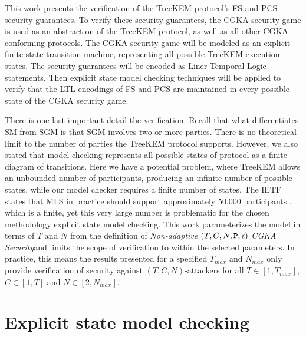 This work presents the verification of the TreeKEM protocol's FS and PCS security guarantees.
To verify these security guarantees, the CGKA security game is used as an abstraction of the TreeKEM protocol, as well as all other CGKA-conforming protocols.
The CGKA security game will be modeled as an explicit finite state transition machine, representing all possible TreeKEM execution states.
The security guarantees will be encoded as Liner Temporal Logic statements.
Then explicit state model checking techniques will be applied to verify that the LTL encodings of FS and PCS are maintained in every possible state of the CGKA security game.

There is one last important detail the verification.
Recall that what differentiates SM from SGM is that SGM involves two or more parties.
There is no theoretical limit to the number of parties the TreeKEM protocol supports.
However, we also stated that model checking represents all possible states of protocol as a finite diagram of transitions.
Here we have a potential problem, where TreeKEM allows an unbounded number of participants, producing an infinite number of possible states, while our model checker requires a finite number of states.
The IETF states that MLS in practice should support approximately 50,000 participants \autocite{Omara2020}, which is a finite, yet this very large number is problematic for the chosen methodology explicit state model checking.
This work parameterizes the model in terms of \(T\) and \(N\) from the definition of \emph{Non-adaptive} \((T, C, N, \textbf{\texttt{P}}, \epsilon)\) \emph{CGKA Security}and limits the scope of verification to within the selected parameters.
In practice, this means the results presented for a specified \(T_{max}\) and \(N_{max}\) only provide verification of security against \((T, C, N)\)-attackers for all \(T \in [1, T_{max}]\), \(C \in [1, T]\) and \(N \in [2, N_{max}]\).

\hypertarget{explicit-state-model-checking}{%
\section{Explicit state model checking}\label{explicit-state-model-checking}}

